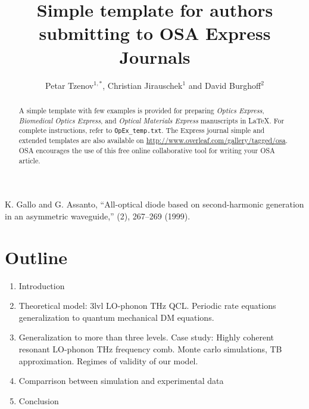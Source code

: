 \documentclass[10pt,letterpaper]{article}
\begin{document}
\title{Simple template for authors submitting to OSA Express Journals}

\author{Petar Tzenov$^{1,*}$, Christian Jirauschek$^1$ and David Burghoff$^{2}$}

\address{$^1$ Institute for Nanoelectronics, Technische Universit\''at M\''unchen, D-80333 Munich, Germany}
\address{$^2$ Somewhere in MIT, US}




\begin{abstract}
A simple template with few examples is provided for preparing \textit{Optics Express}, \textit{Biomedical Optics Express}, and \textit{Optical Materials Express} manuscripts in \LaTeX. For complete instructions, refer to \texttt{OpEx\_temp.txt}. The Express journal simple and extended templates are also available on \url{http://www.overleaf.com/gallery/tagged/osa}. OSA encourages the use of this free online collaborative tool for writing your OSA article.
\end{abstract}


\begin{thebibliography}{99}

 K. Gallo and G. Assanto, ``All-optical diode based on second-harmonic generation in an asymmetric waveguide,'' (2), 267--269 (1999).

\end{thebibliography}

\section{Outline}

\begin{enumerate}
	\item{Introduction} 
	\item{Theoretical model: 3lvl LO-phonon THz QCL. Periodic rate equations  generalization to quantum mechanical DM equations.}
	\item{Generalization to more than three levels. Case study: Highly coherent resonant LO-phonon THz frequency comb. Monte carlo simulations, TB approximation. Regimes of validity of our model. } 
	\item{Comparrison between simulation and experimental data}
	\item{Conclusion}
\end{enumerate}
\end{document}
